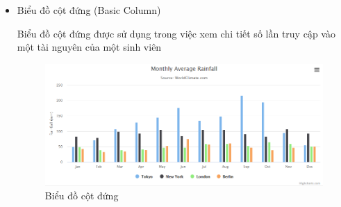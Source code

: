 \begin{itemize}
	\item Biểu đồ cột đứng (Basic Column)
	
	Biểu đồ cột đứng được sử dụng trong việc xem chi tiết số lần truy cập vào một tài nguyên của một sinh viên
	
	\begin{center}
		\begin{figure}[htp]
			\begin{center}
				\includegraphics[scale=0.7]{img/column}
			\end{center}
			\caption{Biểu đồ cột đứng}
			\label{refhinh80}
		\end{figure}
	\end{center}
	
\end{itemize}
